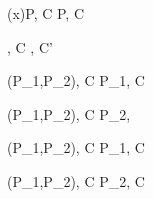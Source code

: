 \begin{figure}
\begin{minipage}{\textwidth}

{ \langle (x)P, C \rangle \rightarrow \langle [x'/x]P, C \rangle }








{ \langle \Endconst, C \rangle \rightarrow {}, C' \rangle }


\begin{minipage}{0.5\textwidth}
{ \langle \Sirx (P_1,P_2), C \rangle \xlongrightarrow{\snull} \langle P_1, C \rangle }
\end{minipage}
\begin{minipage}{0.5\textwidth}
\infrule[Tr-NotConst2]
{ \scon\Sirx \notin  }
{ \langle \Sirx (P_1,P_2), C \rangle \xlongrightarrow{\snnull} \langle P_2,  \rangle }
\end{minipage}
\vspace{2mm}

\begin{minipage}{0.5\textwidth}
{ \langle \Sirx (P_1,P_2), C \rangle \rightarrow \langle P_1, C \rangle }
\end{minipage}
\begin{minipage}{0.5\textwidth}
{ \langle \Sirx (P_1,P_2), C \rangle \rightarrow \langle P_2, C \rangle }
\end{minipage}



\end{minipage}
\end{figure}
